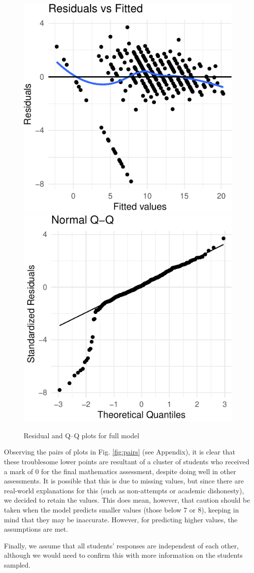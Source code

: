 \documentclass[a4paper,9pt,twocolumn,twoside,]{pinp}
\begin{document}
\begin{figure}[htbp]

{\centering \includegraphics[width=0.45\linewidth]{Executive-summary_files/figure-latex/resid-qq-1} \includegraphics[width=0.45\linewidth]{Executive-summary_files/figure-latex/resid-qq-2} 

}

\caption{Residual and Q–Q plots for full model}\label{fig:resid-qq}
\end{figure}

Observing the pairs of plots in Fig. \ref{fig:pairs} (see Appendix), it
is clear that these troublesome lower points are resultant of a cluster
of students who received a mark of 0 for the final mathematics
assessment, despite doing well in other assessments. It is possible that
this is due to missing values, but since there are real-world
explanations for this (such as non-attempts or academic dishonesty), we
decided to retain the values. This does mean, however, that caution
should be taken when the model predicts smaller values (those below 7 or
8), keeping in mind that they may be inaccurate. However, for predicting
higher values, the assumptions are met.

Finally, we assume that all students' responses are independent of each
other, although we would need to confirm this with more information on
the students sampled.
\end{document}
